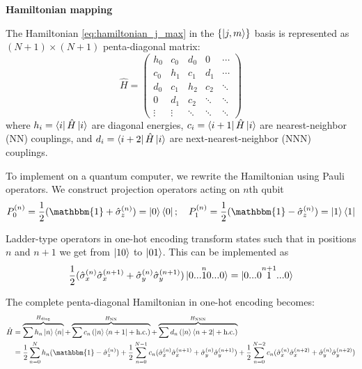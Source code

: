 \documentclass[%
nofootinbib,
 amsmath,amssymb,
 aps,
 prd,
10pt]{revtex4-2}
\newcommand{\Id}{\mathbbm{1}}
\renewcommand{\H}{\hat{H}} %
\begin{document}
\textbf{Hamiltonian mapping}

The Hamiltonian \ref{eq:hamiltonian_j_max} in the $\{\ket{j,m}\}$ basis is represented as $(N+1) \times (N+1)$ penta-diagonal matrix:
\begin{equation}
    \H = \begin{pmatrix}
        h_0 & c_0 & d_0 & 0 & \cdots \\
        c_0 & h_1 & c_1 & d_1 & \cdots \\
        d_0 & c_1 & h_2 & c_2 & \ddots \\
        0 & d_1 & c_2 & \ddots & \ddots \\
        \vdots & \vdots & \ddots & \ddots & \ddots
    \end{pmatrix}
\end{equation}
where $h_i = \bra{i}\H\ket{i}$ are diagonal energies, $c_i = \bra{i+1}\H\ket{i}$ are nearest-neighbor (NN) couplings, and $d_i = \bra{i+2}\H\ket{i}$ are next-nearest-neighbor (NNN) couplings.

To implement on a quantum computer, we rewrite the Hamiltonian using Pauli operators. We construct projection operators acting on $n$th qubit
\begin{equation}
    P_0^{(n)} = \frac{1}{2}(\Id + \hat{\sigma}_z^{(n)}) = \ket{0}\bra{0}; \quad P_1^{(n)} = \frac{1}{2}(\Id - \hat{\sigma}_z^{(n)}) = \ket{1}\bra{1}
\end{equation}

Ladder-type operators in one-hot encoding transform states such that in positions $n$ and $n+1$ we get from $\ket{10}$ to $\ket{01}$. This can be implemented as
\begin{equation}
    \frac{1}{2}(\hat{\sigma}_x^{(n)}\hat{\sigma}_x^{(n+1)} + \hat{\sigma}_y^{(n)}\hat{\sigma}_y^{(n+1)}) \ket{0...\overset{n}{1}0...0}=  \ket{0...0\overset{n+1}{1}...0}
\end{equation}

The complete penta-diagonal Hamiltonian in one-hot encoding becomes:
\begin{equation}
\begin{split}
    \H &=\overbrace{\sum h_n \ket{n}\bra{n}}^{H_{\mathrm{diag}}} + \overbrace{\sum c_n \left(\ket{n}\bra{n+1}+\text{h.c.}\right)}^{H_{\mathrm{NN}}} + \overbrace{\sum d_n \left( \ket{n}\bra{n+2}+\text{h.c.}\right)}^{H_{\mathrm{NNN}}} \\
    &= \frac{1}{2}\sum_{n=0}^{N} h_n (\Id - \hat{\sigma}_z^{(n)}) + \frac{1}{2}\sum_{n=0}^{N-1} c_n (\hat{\sigma}_x^{(n)}\hat{\sigma}_x^{(n+1)} + \hat{\sigma}_y^{(n)}\hat{\sigma}_y^{(n+1)}) + \frac{1}{2}\sum_{n=0}^{N-2} c_n (\hat{\sigma}_x^{(n)}\hat{\sigma}_x^{(n+2)} + \hat{\sigma}_y^{(n)}\hat{\sigma}_y^{(n+2)})
\end{split}
\end{equation}  
\end{document}

